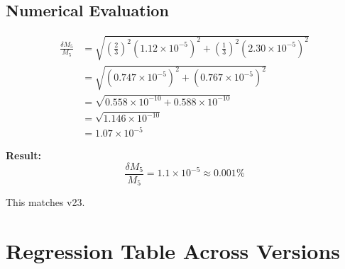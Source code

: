 \documentclass[11pt,a4paper]{article}
\newcommand{\Mfive}{M_5}
\begin{document}
\subsection{Numerical Evaluation}

\begin{align}
\frac{\delta\Mfive}{\Mfive} &= \sqrt{\left(\frac{2}{3}\right)^2 (1.12 \times 10^{-5})^2
+ \left(\frac{1}{3}\right)^2 (2.30 \times 10^{-5})^2} \label{eq:error-compute1}\\
&= \sqrt{(0.747 \times 10^{-5})^2 + (0.767 \times 10^{-5})^2} \label{eq:error-compute2}\\
&= \sqrt{0.558 \times 10^{-10} + 0.588 \times 10^{-10}} \label{eq:error-compute3}\\
&= \sqrt{1.146 \times 10^{-10}} \label{eq:error-compute4}\\
&= 1.07 \times 10^{-5} \label{eq:error-result}
\end{align}

\textbf{Result:}
\begin{equation}
\boxed{\frac{\delta\Mfive}{\Mfive} = 1.1 \times 10^{-5} \approx 0.001\%}
\label{eq:error-boxed}
\end{equation}

This matches v23. \checkmark

\section{Regression Table Across Versions}
\end{document}
